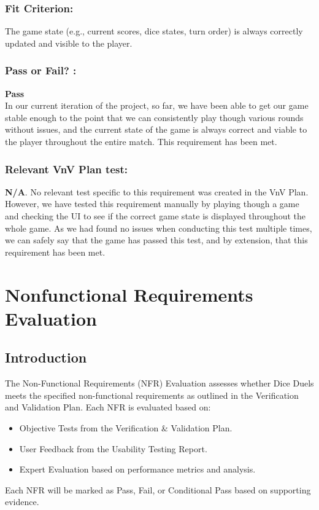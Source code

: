 \documentclass[12pt, titlepage]{article}
\begin{document}
\subsubsection*{Fit Criterion:}The game state (e.g., current scores, dice states, turn order) is always correctly updated and visible to the player.

\subsubsection*{Pass or Fail? :} 

 \noindent \textbf{Pass}\\
 
 \noindent In our current iteration of the project, so far, we have been able to get our game stable enough to the point that we can consistently play though various rounds without issues, and the current state of the game is always correct and viable to the player throughout the entire match. This requirement has been met.
 
 \subsubsection*{Relevant VnV Plan test: } \textbf{N/A}. No relevant test specific to this requirement was created in the VnV Plan. However, we have tested this requirement manually by  playing though a game and checking the UI to see if the correct game state is displayed throughout the whole game. As we had found no issues when conducting this test multiple times, we can safely say that the game has passed this test, and by extension, that this requirement has been met.


\newpage
\section{Nonfunctional Requirements Evaluation}

\subsection{Introduction}

The Non-Functional Requirements (NFR) Evaluation assesses whether Dice Duels meets the specified non-functional requirements as outlined in the Verification and Validation Plan. Each NFR is evaluated based on:
\begin{itemize}
	\item Objective Tests from the Verification \& Validation Plan.
	\item User Feedback from the Usability Testing Report.
	\item Expert Evaluation based on performance metrics and analysis.
\end{itemize}
Each NFR will be marked as Pass, Fail, or Conditional Pass based on supporting evidence.
\end{document}
